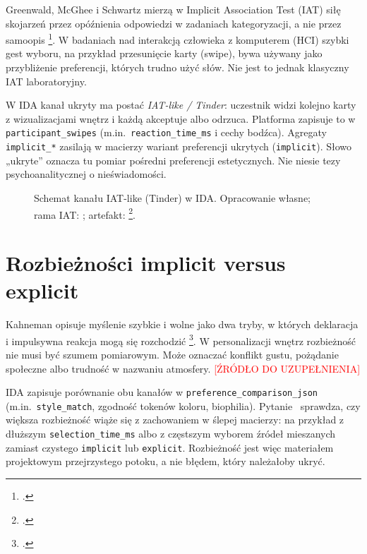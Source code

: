 Greenwald, McGhee i Schwartz mierzą w Implicit Association Test (IAT) siłę skojarzeń przez opóźnienia odpowiedzi w zadaniach kategoryzacji, a nie przez samoopis \footcite{greenwald1998iat}.
W badaniach nad interakcją człowieka z komputerem (HCI) szybki gest wyboru, na przykład przesunięcie karty (swipe), bywa używany jako przybliżenie preferencji, których trudno użyć słów. Nie jest to jednak klasyczny IAT laboratoryjny.

W IDA kanał ukryty ma postać \emph{IAT-like / Tinder}: uczestnik widzi kolejno karty z wizualizacjami wnętrz i każdą akceptuje albo odrzuca. Platforma zapisuje to w \texttt{participant\_swipes} (m.in.\ \texttt{reaction\_time\_ms} i cechy bodźca).
Agregaty \texttt{implicit\_*} zasilają w macierzy wariant preferencji ukrytych (\texttt{implicit}).
Słowo „ukryte” oznacza tu pomiar pośredni preferencji estetycznych. Nie niesie tezy psychoanalitycznej o nieświadomości.

\begin{figure}[htbp]
  \centering
  \caption[Schemat kanału IAT-like (Tinder) w IDA. Opracowanie własne; rama IAT: Greenwald, McGhee i Schwartz; artefakt IDA.]{Schemat kanału IAT-like (Tinder) w IDA.
    Opracowanie własne; rama IAT: \textcite{greenwald1998iat}; artefakt: \footcite{idaPlatform2026}.}
  \label{fig:ch03:tinder-iat}
\end{figure}

\section{Rozbieżności implicit versus explicit}
\label{ch03:sec:rozbieznosci}

Kahneman opisuje myślenie szybkie i wolne jako dwa tryby, w których deklaracja i impulsywna reakcja mogą się rozchodzić \footcite{kahneman2011thinking}.
W personalizacji wnętrz rozbieżność nie musi być szumem pomiarowym. Może oznaczać konflikt gustu, pożądanie społeczne albo trudność w nazwaniu atmosfery. \textcolor{red}{[ŹRÓDŁO DO UZUPEŁNIENIA]}

IDA zapisuje porównanie obu kanałów w \texttt{preference\_comparison\_json} (m.in.\ \texttt{style\_match}, zgodność tokenów koloru, biophilia).
Pytanie~ sprawdza, czy większa rozbieżność wiąże się z zachowaniem w ślepej macierzy: na przykład z dłuższym \texttt{selection\_time\_ms} albo z częstszym wyborem źródeł mieszanych zamiast czystego \texttt{implicit} lub \texttt{explicit}.
Rozbieżność jest więc materiałem projektowym przejrzystego potoku, a nie błędem, który należałoby ukryć.

